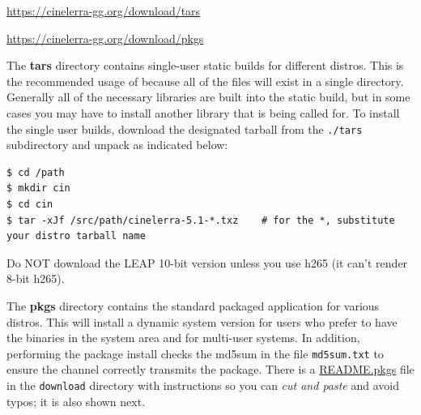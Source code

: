 {\small \url{https://cinelerra-gg.org/download/tars}
	
	\url{https://cinelerra-gg.org/download/pkgs}}

The \textbf{tars} directory contains single-user static builds for different distros.  
This is the recommended usage of \CGG{} because all of the files will exist in a single directory.
Generally all of the necessary libraries are built into the static build, but in some cases you may
have to install another library that is being called for.  
To install the single user builds, download the designated tarball from the \texttt{./tars} subdirectory and unpack as indicated below:

\begin{lstlisting}[numbers=none]
$ cd /path
$ mkdir cin
$ cd cin
$ tar -xJf /src/path/cinelerra-5.1-*.txz    # for the *, substitute your distro tarball name
\end{lstlisting}

Do NOT download the LEAP 10-bit version unless you use h265 (it can't render 8-bit h265).

The \textbf{pkgs} directory contains the standard packaged application for various distros.  
This will install a dynamic system version for users who prefer to have the binaries in the system area and for multi-user systems.  
In addition, performing the package install checks the md5sum in the file \texttt{md5sum.txt} to ensure the channel correctly transmits the package.  
There is a {\small \href{https://cinelerra-gg.org/download/README.pkgs}{README.pkgs}} file in the \texttt{download} directory with instructions so you can \textit{ cut and paste} and avoid typos; it is also shown next.

